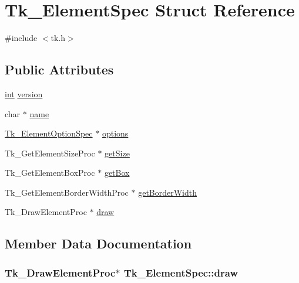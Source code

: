 \hypertarget{struct_tk___element_spec}{}\section{Tk\+\_\+\+Element\+Spec Struct Reference}
\label{struct_tk___element_spec}


{\ttfamily \#include $<$tk.\+h$>$}

\subsection*{Public Attributes}
\begin{DoxyCompactItemize}
\item 
\hyperlink{tk_8h_a83f82f76e7fed06f4c49d2db94028a6d}{int} \hyperlink{struct_tk___element_spec_a0a91b405beabe4970b16248c3706c77b}{version}
\item 
char $\ast$ \hyperlink{struct_tk___element_spec_adc1d733bb6d92bc58bfcf0953f9ffd9d}{name}
\item 
\hyperlink{struct_tk___element_option_spec}{Tk\+\_\+\+Element\+Option\+Spec} $\ast$ \hyperlink{struct_tk___element_spec_af066011845b070a93c98ac7d3bd09762}{options}
\item 
Tk\+\_\+\+Get\+Element\+Size\+Proc $\ast$ \hyperlink{struct_tk___element_spec_a571364fa1ddf1fbff1e895dec371d26e}{get\+Size}
\item 
Tk\+\_\+\+Get\+Element\+Box\+Proc $\ast$ \hyperlink{struct_tk___element_spec_a33cfa221f84d6d990caea07ae9855642}{get\+Box}
\item 
Tk\+\_\+\+Get\+Element\+Border\+Width\+Proc $\ast$ \hyperlink{struct_tk___element_spec_a9df58f19518543330455fef2858b6a30}{get\+Border\+Width}
\item 
Tk\+\_\+\+Draw\+Element\+Proc $\ast$ \hyperlink{struct_tk___element_spec_a69889eff787342b1af6d5670fef55493}{draw}
\end{DoxyCompactItemize}


\subsection{Member Data Documentation}
\subsubsection[{\texorpdfstring{draw}{draw}}]{\setlength{\rightskip}{0pt plus 5cm}Tk\+\_\+\+Draw\+Element\+Proc$\ast$ Tk\+\_\+\+Element\+Spec\+::draw}\hypertarget{struct_tk___element_spec_a69889eff787342b1af6d5670fef55493}{}\label{struct_tk___element_spec_a69889eff787342b1af6d5670fef55493}
